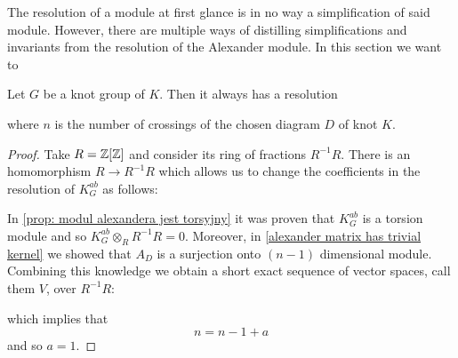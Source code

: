 The resolution of a module at first glance is in no way a simplification of said module. However, there are multiple ways of distilling simplifications and invariants from the resolution of the Alexander module. In this section we want to 

\begin{proposition}
  Let $G$ be a knot group of $K$. Then it always has a resolution
  \begin{center}
  \end{center}
  where $n$ is the number of crossings of the chosen diagram $D$ of knot $K$.
\end{proposition}

\begin{proof}
  Take $R=\operatorname{\mathbb{Z}}[\operatorname{\mathbb{Z}}]$ and consider its ring of fractions $R^{-1}R$. There is an homomorphism $R\to R^{-1}R$ which allows us to change the coefficients in the resolution of $K_G^{ab}$ as follows:
  \begin{center}
  \end{center}
  In \cref{prop: modul alexandera jest torsyjny} it was proven that $K_G^{ab}$ is a torsion module and so $K_G^{ab}\otimes_R R^{-1}R=0$. Moreover, in \cref{alexander matrix has trivial kernel} we showed that $A_D$ is a surjection onto $(n-1)$ dimensional module. Combining this knowledge we obtain a short exact sequence of vector spaces, call them $V$, over $R^{-1}R$:
  \begin{center}
  \end{center}
  which implies that 
  $$n=n-1+a$$ 
  and so $a=1$.
\end{proof}


